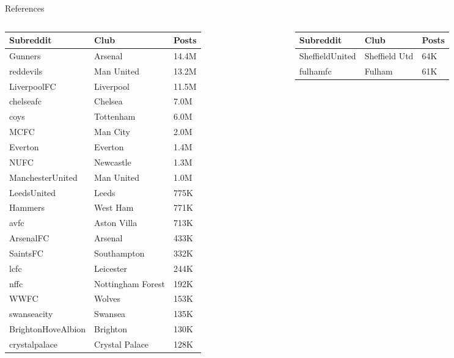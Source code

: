 \documentclass[10pt]{beamer}
\begin{document}
\begin{frame}[allowframebreaks]{References}
  \printbibliography
\end{frame}


\begin{frame}
\scriptsize
\begin{columns}
\begin{column}{0.5\textwidth}
\centering
\begin{tabular}{p{.35\linewidth}p{.25\linewidth}p{.1\linewidth}}
\hline
\textbf{Subreddit} & \textbf{Club} & \textbf{Posts} \\
\hline
Gunners & Arsenal & 14.4M \\  
reddevils & Man United & 13.2M \\
LiverpoolFC & Liverpool & 11.5M \\
chelseafc & Chelsea & 7.0M \\
coys & Tottenham & 6.0M \\   
MCFC & Man City & 2.0M \\
Everton & Everton & 1.4M \\
NUFC & Newcastle & 1.3M \\
ManchesterUnited & Man United & 1.0M \\ 
LeedsUnited & Leeds & 775K \\
Hammers & West Ham & 771K \\
avfc & Aston Villa & 713K \\
ArsenalFC & Arsenal & 433K \\
SaintsFC & Southampton & 332K \\
lcfc & Leicester & 244K \\        
nffc & Nottingham Forest & 192K \\        
WWFC & Wolves & 153K \\           
swanseacity & Swansea & 135K \\    
BrightonHoveAlbion & Brighton & 130K \\
crystalpalace & Crystal Palace & 128K \\
\hline
\end{tabular}
\end{column}
\begin{column}{0.5\textwidth}
\centering
\begin{tabular}{p{.35\linewidth}p{.25\linewidth}p{.1\linewidth}}
\hline
\textbf{Subreddit} & \textbf{Club} & \textbf{Posts} \\
\hline
SheffieldUnited & Sheffield Utd & 64K \\
fulhamfc & Fulham & 61K \\

\end{tabular}
\end{column}
\end{columns}
\end{frame}
\end{document}
